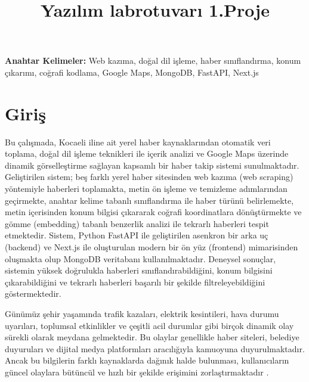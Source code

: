 \documentclass[conference]{IEEEtran}
\begin{document}
\title{Yazılım labrotuvarı 1.Proje}

\author{
\and
{}
}

\maketitle

\textbf{Anahtar Kelimeler:} 
Web kazıma, doğal dil işleme, haber sınıflandırma, konum çıkarımı, coğrafi kodlama, Google Maps, MongoDB, FastAPI, Next.js

\section{Giriş}
\label{sec:giris}

Bu çalışmada, Kocaeli iline ait yerel haber kaynaklarından otomatik veri toplama, doğal dil işleme teknikleri ile içerik analizi ve Google Maps üzerinde dinamik görselleştirme sağlayan kapsamlı bir haber takip sistemi sunulmaktadır. Geliştirilen sistem; beş farklı yerel haber sitesinden web kazıma (web scraping) yöntemiyle haberleri toplamakta, metin ön işleme ve temizleme adımlarından geçirmekte, anahtar kelime tabanlı sınıflandırma ile haber türünü belirlemekte, metin içerisinden konum bilgisi çıkararak coğrafi koordinatlara dönüştürmekte ve gömme (embedding) tabanlı benzerlik analizi ile tekrarlı haberleri tespit etmektedir. Sistem, Python FastAPI ile geliştirilen asenkron bir arka uç (backend) ve Next.js ile oluşturulan modern bir ön yüz (frontend) mimarisinden oluşmakta olup MongoDB veritabanı kullanılmaktadır. Deneysel sonuçlar, sistemin yüksek doğrulukla haberleri sınıflandırabildiğini, konum bilgisini çıkarabildiğini ve tekrarlı haberleri başarılı bir şekilde filtreleyebildiğini göstermektedir.

Günümüz şehir yaşamında trafik kazaları, elektrik kesintileri, hava durumu uyarıları, toplumsal etkinlikler ve çeşitli acil durumlar gibi birçok dinamik olay sürekli olarak meydana gelmektedir. Bu olaylar genellikle haber siteleri, belediye duyuruları ve dijital medya platformları aracılığıyla kamuoyuna duyurulmaktadır. Ancak bu bilgilerin farklı kaynaklarda dağınık halde bulunması, kullanıcıların güncel olaylara bütüncül ve hızlı bir şekilde erişimini zorlaştırmaktadır \cite{liu2019}.
\end{document}
